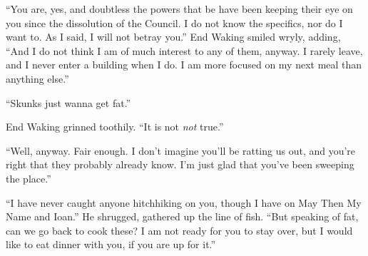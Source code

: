 ``You are, yes, and doubtless the powers that be have been keeping their eye on you since the dissolution of the Council. I do not know the specifics, nor do I want to. As I said, I will not betray you.'' End Waking smiled wryly, adding, ``And I do not think I am of much interest to any of them, anyway. I rarely leave, and I never enter a building when I do. I am more focused on my next meal than anything else.''

``Skunks just wanna get fat.''

End Waking grinned toothily. ``It is not \emph{not} true.''

``Well, anyway. Fair enough. I don't imagine you'll be ratting us out, and you're right that they probably already know. I'm just glad that you've been sweeping the place.''

``I have never caught anyone hitchhiking on you, though I have on May Then My Name and Ioan.'' He shrugged, gathered up the line of fish. ``But speaking of fat, can we go back to cook these? I am not ready for you to stay over, but I would like to eat dinner with you, if you are up for it.''
